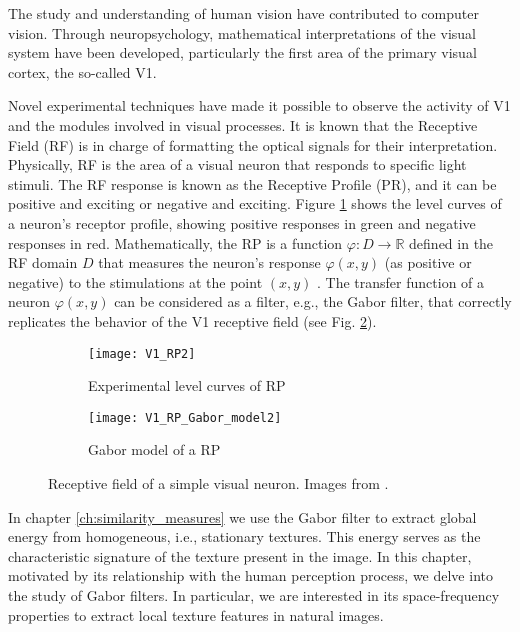 The study and understanding of human vision have contributed to computer vision. Through neuropsychology, mathematical interpretations of the visual system have been developed, particularly the first area of the primary visual cortex, the so-called V1.

Novel experimental techniques \citep{DeAngelis.Ohzawa.ea:TN:1995} have made it possible to observe the activity of V1 and the modules involved in visual processes. It is known that the Receptive Field (RF) is in charge of formatting the optical signals for their interpretation. Physically, RF is the area of a visual neuron that responds to specific light stimuli. The RF response is known as the Receptive Profile (PR), and it can be positive and exciting or negative and exciting. Figure \ref{fig:V1_RP} shows the level curves of a neuron's receptor profile, showing positive responses in green and negative responses in red. 
Mathematically, the RP is a function $\varphi:  D \rightarrow \mathbb{R}$ defined in the RF domain $D$ that measures the neuron's response $\varphi(x,y)$ (as positive or negative) to the stimulations at the point $(x,y)$ \citep{Petitot:Neurogeometrie:2008}.
The transfer function of a neuron $\varphi(x,y)$ can be considered as a filter, e.g., the Gabor filter, that correctly replicates the behavior of the V1 receptive field (see Fig. \ref{fig:V1_RP_Gabor}).

\begin{figure}[!ht] 
	\centering
	\begin{subfigure}[b]{0.4\textwidth}
		\centering
		\texttt{[image: V1\_RP2]}
		\caption{Experimental level curves of RP}	
		\label{fig:V1_RP}
	\end{subfigure}
	\qquad %
	\begin{subfigure}[b]{0.4\textwidth}
		\centering
		\texttt{[image: V1\_RP\_Gabor\_model2]}
		\caption{Gabor model of a RP }	
		\label{fig:V1_RP_Gabor}
	\end{subfigure}

  \caption{Receptive field of a simple visual neuron. Images from \citep{Petitot:Neurogeometrie:2008}.}
  \label{fig:simple_neuron_receptive_profil}
\end{figure}

In chapter \ref{ch:similarity_measures} we use the Gabor filter to extract global energy from homogeneous, i.e., stationary textures. This energy serves as the characteristic signature of the texture present in the image. In this chapter, motivated by its relationship with the human perception process, we delve into the study of Gabor filters. In particular, we are interested in its space-frequency properties to extract local texture features in natural images.

